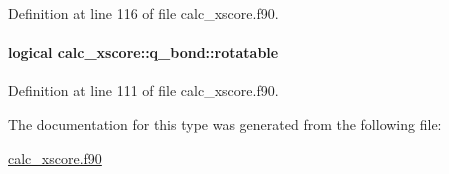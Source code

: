 Definition at line 116 of file calc\-\_\-xscore.\-f90.

\hypertarget{structcalc__xscore_1_1q__bond_af71aff797c787a97c7bf478bc18154cb}{
\paragraph[{rotatable}]{\setlength{\rightskip}{0pt plus 5cm}logical calc\-\_\-xscore\-::q\-\_\-bond\-::rotatable}}\label{structcalc__xscore_1_1q__bond_af71aff797c787a97c7bf478bc18154cb}


Definition at line 111 of file calc\-\_\-xscore.\-f90.



The documentation for this type was generated from the following file\-:\begin{DoxyCompactItemize}
\item 
\hyperlink{calc__xscore_8f90}{calc\-\_\-xscore.\-f90}\end{DoxyCompactItemize}

